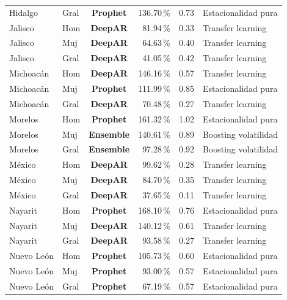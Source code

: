 \documentclass[12pt, letterpaper]{article}
\begin{document}
\begin{longtable}{l l >{\bfseries}c r r l}
Hidalgo & Gral & \textcolor{cprophet}{\textbf{Prophet}} & 136.70\,\% & 0.73 & Estacionalidad pura \\
Jalisco & Hom & \textcolor{cdeepar}{\textbf{DeepAR}} & 81.94\,\% & 0.33 & Transfer learning \\
Jalisco & Muj & \textcolor{cdeepar}{\textbf{DeepAR}} & 64.63\,\% & 0.40 & Transfer learning \\
Jalisco & Gral & \textcolor{cdeepar}{\textbf{DeepAR}} & 41.05\,\% & 0.42 & Transfer learning \\
Michoacán & Hom & \textcolor{cdeepar}{\textbf{DeepAR}} & 146.16\,\% & 0.57 & Transfer learning \\
Michoacán & Muj & \textcolor{cprophet}{\textbf{Prophet}} & 111.99\,\% & 0.85 & Estacionalidad pura \\
Michoacán & Gral & \textcolor{cdeepar}{\textbf{DeepAR}} & 70.48\,\% & 0.27 & Transfer learning \\
Morelos & Hom & \textcolor{cprophet}{\textbf{Prophet}} & 161.32\,\% & 1.02 & Estacionalidad pura \\
Morelos & Muj & \textcolor{censemble}{\textbf{Ensemble}} & 140.61\,\% & 0.89 & Boosting volatilidad \\
Morelos & Gral & \textcolor{censemble}{\textbf{Ensemble}} & 97.28\,\% & 0.92 & Boosting volatilidad \\
México & Hom & \textcolor{cdeepar}{\textbf{DeepAR}} & 99.62\,\% & 0.28 & Transfer learning \\
México & Muj & \textcolor{cdeepar}{\textbf{DeepAR}} & 84.70\,\% & 0.35 & Transfer learning \\
México & Gral & \textcolor{cdeepar}{\textbf{DeepAR}} & 37.65\,\% & 0.11 & Transfer learning \\
Nayarit & Hom & \textcolor{cprophet}{\textbf{Prophet}} & 168.10\,\% & 0.76 & Estacionalidad pura \\
Nayarit & Muj & \textcolor{cdeepar}{\textbf{DeepAR}} & 140.12\,\% & 0.61 & Transfer learning \\
Nayarit & Gral & \textcolor{cdeepar}{\textbf{DeepAR}} & 93.58\,\% & 0.27 & Transfer learning \\
Nuevo León & Hom & \textcolor{cprophet}{\textbf{Prophet}} & 105.73\,\% & 0.60 & Estacionalidad pura \\
Nuevo León & Muj & \textcolor{cprophet}{\textbf{Prophet}} & 93.00\,\% & 0.57 & Estacionalidad pura \\
Nuevo León & Gral & \textcolor{cprophet}{\textbf{Prophet}} & 67.19\,\% & 0.57 & Estacionalidad pura \\

\end{longtable}
\end{document}
